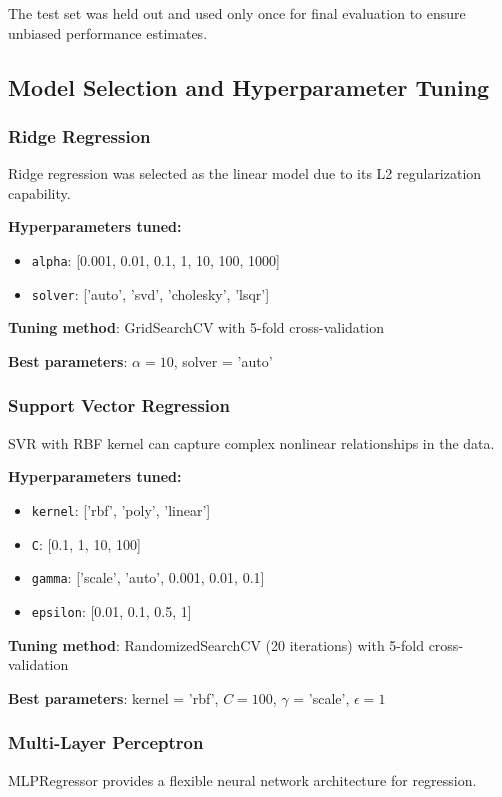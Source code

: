 \documentclass[conference]{IEEEtran}
\begin{document}
The test set was held out and used only once for final evaluation to ensure unbiased performance estimates.

\subsection{Model Selection and Hyperparameter Tuning}

\subsubsection{Ridge Regression}
Ridge regression was selected as the linear model due to its L2 regularization capability.

\textbf{Hyperparameters tuned:}
\begin{itemize}
    \item \texttt{alpha}: [0.001, 0.01, 0.1, 1, 10, 100, 1000]
    \item \texttt{solver}: ['auto', 'svd', 'cholesky', 'lsqr']
\end{itemize}

\textbf{Tuning method}: GridSearchCV with 5-fold cross-validation

\textbf{Best parameters}: $\alpha = 10$, solver = 'auto'

\subsubsection{Support Vector Regression}
SVR with RBF kernel can capture complex nonlinear relationships in the data.

\textbf{Hyperparameters tuned:}
\begin{itemize}
    \item \texttt{kernel}: ['rbf', 'poly', 'linear']
    \item \texttt{C}: [0.1, 1, 10, 100]
    \item \texttt{gamma}: ['scale', 'auto', 0.001, 0.01, 0.1]
    \item \texttt{epsilon}: [0.01, 0.1, 0.5, 1]
\end{itemize}

\textbf{Tuning method}: RandomizedSearchCV (20 iterations) with 5-fold cross-validation

\textbf{Best parameters}: kernel = 'rbf', $C = 100$, $\gamma$ = 'scale', $\epsilon = 1$

\subsubsection{Multi-Layer Perceptron}
MLPRegressor provides a flexible neural network architecture for regression.
\end{document}
